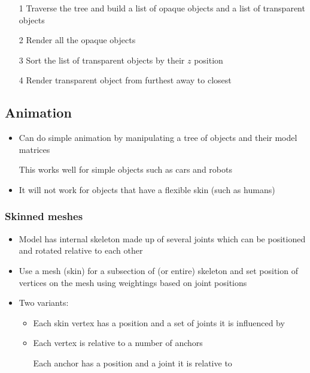 \documentclass[a4paper]{article}
\begin{document}
\begin{enumerate}
  \item[1]
    Traverse the tree and build a list of opaque objects and a list of
    transparent objects

  \item[2]
    Render all the opaque objects

  \item[3]
    Sort the list of transparent objects by their $z$ position

  \item[4]
    Render transparent object from furthest away to closest

\end{enumerate}

\subsection{Animation}

\begin{itemize}
  \item
    Can do simple animation by manipulating a tree of objects and their model
    matrices

    This works well for simple objects such as cars and robots

  \item
    It will not work for objects that have a flexible skin (such as humans)

\end{itemize}

\subsubsection{Skinned meshes}

\begin{itemize}
  \item
    Model has internal skeleton made up of several joints which can be
    positioned and rotated relative to each other

  \item
    Use a mesh (skin) for a subsection of (or entire) skeleton and set position
    of vertices on the mesh using weightings based on joint positions

  \item
    Two variants:

    \begin{itemize}
      \item
        Each skin vertex has a position and a set of joints it is influenced by

      \item
        Each vertex is relative to a number of anchors

        Each anchor has a position and a joint it is relative to

    \end{itemize}

\end{itemize}
\end{document}
